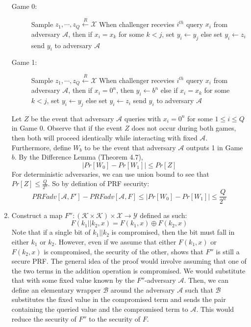 \documentclass[11pt]{article}
\begin{document}
\begin{enumerate}
  \begin{description}
    \item[Game 0:]
          Sample $z_1, \cdots, z_Q \xleftarrow{R} \mathcal{X}$ \newline
          When challenger recevies $i^{th}$ query $x_i$ from adversary $\mathcal{A}$, then \newline
          if $x_i = x_k$ for some $k < j$, set $y_i \leftarrow y_j $ \newline
          else set $y_i \leftarrow z_i$
          send $y_i$ to adversary $\mathcal{A}$
    \item[Game 1:]
      Sample $z_1, \cdots, z_Q \xleftarrow{R} \mathcal{X}$ \newline
      When challenger recevies $i^{th}$ query $x_i$ from adversary $\mathcal{A}$, then \newline
      if $x_i = 0^n$, then $y_i \leftarrow b^n$ \newline
      else if $x_i = x_k$ for some $k < j$, set $y_i \leftarrow y_j $ \newline
      else set $y_i \leftarrow z_i$
      send $y_i$ to adversary $\mathcal{A}$
  \end{description}
  Let $Z$ be the event that adversary $\mathcal{A}$ queries with $x_i = 0^n$ for some $1 \leq i \leq Q$ in Game 0. Observe that if the event $Z$ does not occur during both games, then both will proceed identically while interacting with fixed $\mathcal{A}$. Furthermore, define $W_b$ to be the event that adversary $\mathcal{A}$ outputs 1 in Game $b$. By the Difference Lemma (Theorem 4.7),
  \[ |Pr[W_0] - Pr[W_1]| \leq Pr[Z]\]
  For deterministic adversaries, we can use union bound to see that $Pr[Z] \leq \frac{Q}{2^n}$. So by defintion of PRF security:
  \[ PRFadv[\mathcal{A}, F'] - PRFadv[\mathcal{A}, F]  \leq |Pr[W_0] - Pr[W_1]| \leq \frac{Q}{2^n} \]

  \item Construct a map $F'': (\mathcal{K} \times \mathcal{K}) \times \mathcal{X} \rightarrow \mathcal{Y}$ defined as such:
  \[ F(k_1||k_2, x) =  F(k_1, x) \oplus F(k_2, x)\]
  Note that if a single bit of $k_1 || k_2$ is compromised, then the bit must fall in either $k_1$ or $k_2$. However, even if we assume that either $F(k_1, x)$ or $F(k_2, x)$ is compromised, the security of the other, shows that $F''$ is still a secure PRF. The general idea of the proof would involve assuming that one of the two terms in the addition operation is compromised. We would substitute that with some fixed value known by the $F''$-adversary $\mathcal{A}$. Then, we can define an elementary wrapper $\mathcal{B}$ around the adversary $\mathcal{A}$ such that $\mathcal{B}$ substitutes the fixed value in the compromised term and sends the pair containing the queried value and the compromised term to $\mathcal{A}$. This would reduce the security of $F''$ to the security of $F$.
\end{enumerate}
\end{document}
